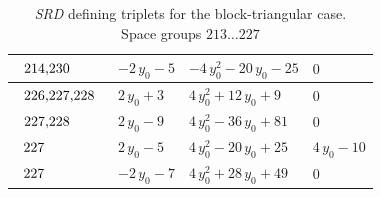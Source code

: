 \begin{table}[H]
\begin{center}
{\begin{tabular}{|l|l|l|l|}
$\begin{tabular}{l}
214,230 \\
\end{tabular}$ & $ -2 \, y_{0} - 5 $ & $ -4 \, y_{0}^{2} - 20 \, y_{0} - 25 $ & $ 0 $ \\ \hline
$\begin{tabular}{l}
226,227,228 \\
\end{tabular}$ & $ 2 \, y_{0} + 3 $ & $ 4 \, y_{0}^{2} + 12 \, y_{0} + 9 $ & $ 0 $ \\ \hline
$\begin{tabular}{l}
227,228 \\
\end{tabular}$ & $ 2 \, y_{0} - 9 $ & $ 4 \, y_{0}^{2} - 36 \, y_{0} + 81 $ & $ 0 $ \\ \hline
$\begin{tabular}{l}
227 \\
\end{tabular}$ & $ 2 \, y_{0} - 5 $ & $ 4 \, y_{0}^{2} - 20 \, y_{0} + 25 $ & $ 4 \, y_{0} - 10 $ \\ \hline
$\begin{tabular}{l}
227 \\
\end{tabular}$ & $ -2 \, y_{0} - 7 $ & $ 4 \, y_{0}^{2} + 28 \, y_{0} + 49 $ & $ 0 $ \\ \hline
\end{tabular}
}
\captionsetup{justification=centering}
\caption{\textit{SRD} defining triplets for the block-triangular case. \\ Space groups $213 \dots227 $}
\label{tab:case1_srdegrees308}
\end{center}
\end{table}


